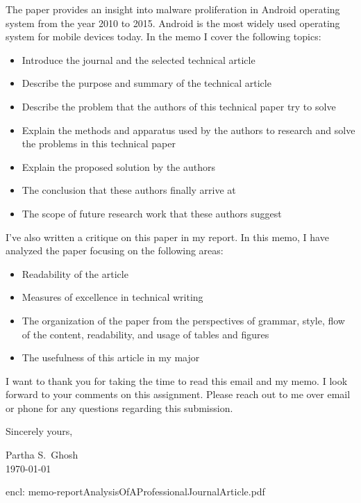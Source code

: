 \documentclass{article} %
\begin{document}
\noindent The paper provides an insight into malware proliferation in Android operating system from the year 2010 to 2015. Android is the most widely used operating system for mobile devices today. In the memo I cover the following topics:
\begin{itemize}
    \item Introduce the journal and the selected technical article
    \item Describe the purpose and summary of the technical article
    \item Describe the problem that the authors of this technical paper try to solve
    \item Explain the methods and apparatus used by the authors to research and solve the problems in this technical paper
    \item Explain the proposed solution by the authors
    \item The conclusion that these authors finally arrive at
    \item The scope of future research work that these authors suggest
\end{itemize}

\noindent I've also written a critique on this paper in my report. In this memo, I have analyzed the paper focusing on the following areas:
\begin{itemize}
    \item Readability of the article
    \item Measures of excellence in technical writing
    \item The organization of the paper from the perspectives of grammar, style, flow of the content, readability, and usage of tables and figures
    \item The usefulness of this article in my major
\end{itemize}


\noindent I want to thank you for taking the time to read this email and my memo. I look forward to your comments on this assignment. Please reach out to me over email or phone for any questions regarding this submission.


\noindent Sincerely yours,

\noindent Partha S.\ Ghosh \\           %
\noindent \today

\noindent encl: memo-reportAnalysisOfAProfessionalJournalArticle.pdf	%
\end{document}
